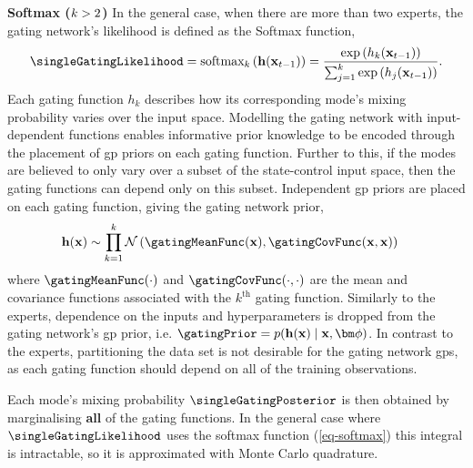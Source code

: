 \documentclass{mimosis-class/mimosis}
\numberwithin{equation}{chapter}
\newcommand{\numData}{\ensuremath{t}}
\newcommand{\modeInd}{\ensuremath{k}}
\newcommand{\ModeInd}{\ensuremath{\MakeUppercase{\modeInd}}}
\newcommand{\allData}[1]{\ensuremath{\MakeUppercase{#1}}}
\newcommand{\mode}[1]{\ensuremath{#1_{\modeInd}}}
\newcommand{\x}{\ensuremath{\mathbf{x}}}
\newcommand{\singleInput}{\ensuremath{\x_{\numData-1}}}
\newcommand{\allInput}{\ensuremath{\allData{\x}}}
\newcommand{\gatingFunc}{\ensuremath{h}}
\newcommand{\GatingFunc}{\ensuremath{\mathbf{\gatingFunc}}}
\newcommand{\gatingParams}{\ensuremath{\bm\phi}}
\begin{document}
{\textbf{Softmax (\(\ModeInd>2\))} In the general case, when there are more than two experts,
the gating network's likelihood is defined as the Softmax function,
\begin{align} \label{eq-softmax}
\singleGatingLikelihood = \text{softmax}_{\modeInd}\left(\GatingFunc(\singleInput)\right) = \frac{\text{exp}\left(\mode{\gatingFunc}(\singleInput)\right)}{\sum_{j=1}^{\ModeInd} \text{exp}\left(\gatingFunc_j(\singleInput) \right)}.
\end{align}
Each gating function \(\mode{\gatingFunc}\) describes how its corresponding mode's mixing
probability varies over the input space.
Modelling the gating network with input-dependent functions enables
informative prior knowledge to be encoded through the placement of \acrshort{gp} priors on each gating function.
Further to this, if the modes are believed to only vary over a subset of the state-control input space,
then the gating functions can depend only on this subset.
Independent \acrshort{gp} priors are placed on each gating function, giving the gating network prior,
\begin{align} \label{eq-gating-prior}
\GatingFunc(\allInput) &\sim \prod_{\modeInd=1}^\ModeInd \mathcal{N}\left( \gatingMeanFunc(\allInput), \gatingCovFunc(\allInput, \allInput) \right)
\end{align}
where \(\gatingMeanFunc(\cdot)\) and \(\gatingCovFunc(\cdot,\cdot)\) are the mean and covariance functions
associated with the \(\modeInd^\text{th}\) gating function.
Similarly to the experts, dependence on the inputs and hyperparameters is dropped from the gating network's \acrshort{gp} prior,
i.e. \(\gatingPrior = p(\GatingFunc(\allInput) \mid \allInput, \gatingParams)\).
In contrast to the experts, partitioning the data set is not desirable for the gating network \acrshort{gps},
as each gating function should depend on all of the training observations.

Each mode's mixing probability \(\singleGatingPosterior\) is then obtained by marginalising
\textbf{all} of the gating functions.
In the general case where \(\singleGatingLikelihood\) uses the softmax function
(\cref{eq-softmax}) this integral is intractable, so it is approximated with Monte Carlo quadrature.

}
\end{document}
